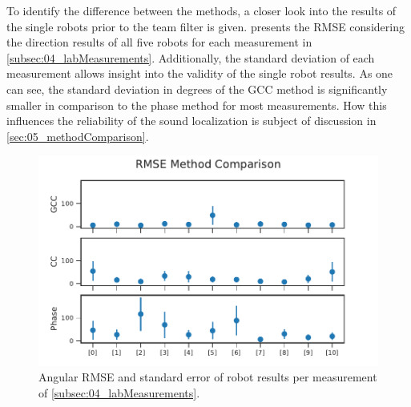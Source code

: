 To identify the difference between the methods, a closer look
into the results of the single robots prior to the team filter is given.
 presents the \ac{RMSE} considering the
direction results of all five robots for each measurement in
\cref{subsec:04_labMeasurements}.
Additionally, the standard deviation of each measurement allows insight
into the validity of the single robot results.
As one can see, the standard deviation in degrees of the \ac{GCC} method is
significantly smaller in comparison to the phase method for most
measurements.
How this influences the reliability of the sound localization is
subject of discussion in \cref{sec:05_methodComparison}.
\begin{figure}[ht]
	\centering
		\includegraphics[]{figures/evaluation/compare_rmse}
	\caption{Angular RMSE and standard error of robot results per
	measurement of \cref{subsec:04_labMeasurements}.}
    \label{fig:04_compareRmse}
\end{figure}

